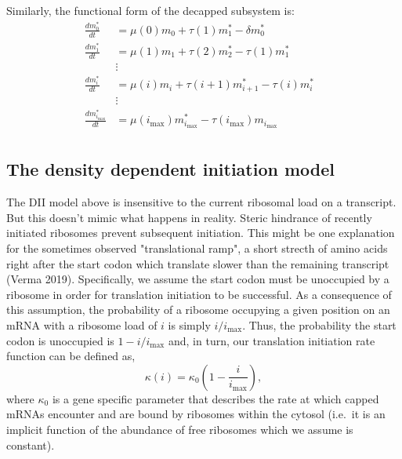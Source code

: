 \documentclass[review]{elsarticle}
\newcommand{\imax}{\ensuremath{i_{\max}}\xspace}
\begin{document}
Similarly, the functional form of the decapped subsystem is:
\begin{align*}
\frac{dm_{0}^{*}}{dt} &= \mu(0)m_{0}+\tau(1)m_{1}^{*}-\delta m_{0}^{*} \\
\frac{dm_{1}^{*}}{dt} &= \mu(1)m_{1}+\tau(2)m_{2}^{*}-\tau(1)m_{1}^{*} \\
& \vdots & \\
\frac{dm_{i}^{*}}{dt} &= \mu(i)m_{i}+\tau(i+1)m_{i+1}^{*}-\tau(i)m_{i}^{*} \\
& \vdots & \\
\frac{dm_{\imax}^{*}}{dt} &= \mu(\imax)m_{\imax}^{*}-\tau(\imax)m_{\imax} \\
\end{align*}

\subsection{The density dependent initiation model}\label{sec:assumed_forms}
The DII model above is insensitive to the current ribosomal load on a transcript. 
But this doesn't mimic what happens in reality. Steric hindrance of recently initiated ribosomes prevent subsequent initiation.
This might be one explanation for the sometimes observed "translational ramp", a short strecth of amino acids right after the start codon which translate slower than the remaining transcript (Verma 2019). 
Specifically, we assume the start codon must be unoccupied by a ribosome in order for translation initiation to be successful.
As a consequence of this assumption, the probability of a ribosome occupying a given position on an mRNA with a ribosome load of $i$ is simply $i/\imax$.
Thus, the probability the start codon is unoccupied is $1-i/\imax$ and, in turn, our translation initiation rate function can be defined as, 
\begin{equation}\label{eq:kappa}
\kappa(i)=\kappa_0\left(1-\frac{i}{\imax}\right),
\end{equation} 
where $\kappa_0$ is a gene specific parameter that describes the rate at which capped mRNAs encounter and are bound by ribosomes within the cytosol (i.e.~it is an implicit function of the abundance of free ribosomes which we assume is constant).
\end{document}
